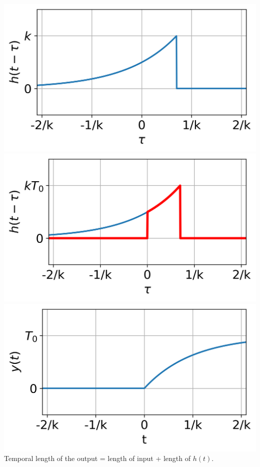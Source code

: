 \documentclass[10pt,landscape]{article}
\begin{document}
\begin{multicols}{3}
		\includegraphics[width=\textwidth/5]{thermo_impulse_response_reversed_case2}
		\includegraphics[width=\textwidth/5]{thermo_impulse_response_reversed_case2b}
		\includegraphics[width=\textwidth/5]{thermo_step_response}\\
		Temporal length of the output = length of input + length of $h(t)$.
		

\end{multicols}
\end{document}
